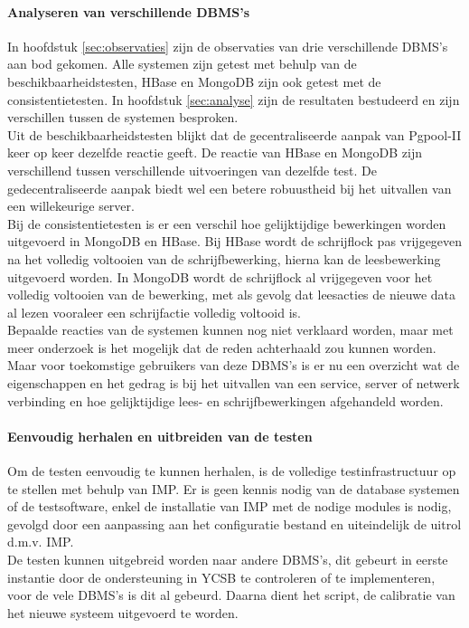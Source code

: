\paragraph{Analyseren van verschillende DBMS's} In hoofdstuk \ref{sec:observaties} zijn de observaties van drie verschillende DBMS's aan bod gekomen. Alle systemen zijn getest met behulp van de beschikbaarheidstesten, HBase en MongoDB zijn ook getest met de consistentietesten. In hoofdstuk \ref{sec:analyse} zijn de resultaten bestudeerd en zijn verschillen tussen de systemen besproken. \\
Uit de beschikbaarheidstesten blijkt dat de gecentraliseerde aanpak van Pgpool-II keer op keer dezelfde reactie geeft. De reactie van HBase en MongoDB zijn verschillend tussen verschillende uitvoeringen van dezelfde test. De gedecentraliseerde aanpak biedt wel een betere robuustheid bij het uitvallen van een willekeurige server. \\
Bij de consistentietesten is er een verschil hoe gelijktijdige bewerkingen worden uitgevoerd in MongoDB en HBase. Bij HBase wordt de schrijflock pas vrijgegeven na het volledig voltooien van de schrijfbewerking, hierna kan de leesbewerking uitgevoerd worden. In MongoDB wordt de schrijflock al vrijgegeven voor het volledig voltooien van de bewerking, met als gevolg dat leesacties de nieuwe data al lezen vooraleer een schrijfactie volledig voltooid is. \\
Bepaalde reacties van de systemen kunnen nog niet verklaard worden, maar met meer onderzoek is het mogelijk dat de reden achterhaald zou kunnen worden. Maar voor toekomstige gebruikers van deze DBMS's is er nu een overzicht wat de eigenschappen en het gedrag is bij het uitvallen van een service, server of netwerk verbinding en hoe gelijktijdige lees- en schrijfbewerkingen afgehandeld worden. 

\paragraph{Eenvoudig herhalen en uitbreiden van de testen} Om de testen eenvoudig te kunnen herhalen, is de volledige testinfrastructuur op te stellen met behulp van IMP. Er is geen kennis nodig van de database systemen of de testsoftware, enkel de installatie van IMP met de nodige modules is nodig, gevolgd door een aanpassing aan het configuratie bestand en uiteindelijk de uitrol d.m.v. IMP. \\
De testen kunnen uitgebreid worden naar andere DBMS's, dit gebeurt in eerste instantie door de ondersteuning in YCSB te controleren of te implementeren, voor de vele DBMS's is dit al gebeurd. Daarna dient het script, de calibratie van het nieuwe systeem uitgevoerd te worden. 